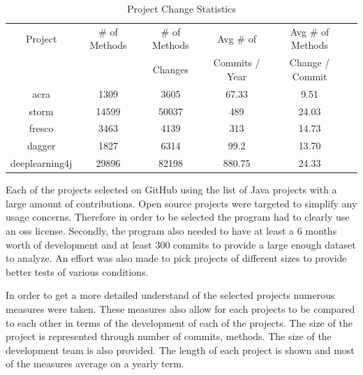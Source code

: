 \begin{table}
\begin{center}
    \begin{tabular}{|c|c|c|c|c|c|}
        \hline
        Project & \# of Methods & \# of Methods & Avg \# of & Avg \# of Methods \\
         & & Changes & Commits / Year & Change / Commit \\
        \hline
        acra & 1309 & 3605 & 67.33 & 9.51 \\
        storm & 14599 & 50037 & 489 & 24.03 \\
        fresco & 3463 & 4139 & 313 & 14.73 \\
        dagger & 1827 & 6314 & 99.2 & 13.70 \\
        deeplearning4j & 29896 & 82198 & 880.75 & 24.33 \\
        \hline
    \end{tabular}
\end{center}
\caption{Project Change Statistics}
\label{tab:project_stats}
\end{table}

Each of the projects selected on GitHub using the list of Java projects with a large amount of contributions. Open source projects were targeted to simplify any usage concerns. Therefore in order to be selected the program had to clearly use an \gls{oss} license. Secondly, the program also needed to have at least a 6 months worth of development and at least 300 commits to provide a large enough dataset to analyze. An effort was also made to pick projects of different sizes to provide better tests of various conditions.


In order to get a more detailed understand of the selected projects numerous measures were taken. These measures also allow for each projects to be compared to each other in terms of the development of each of the projects. The size of the project is represented through number of commits, methods. The size of the development team is also provided. The length of each project is shown and most of the measures average on a yearly term.


